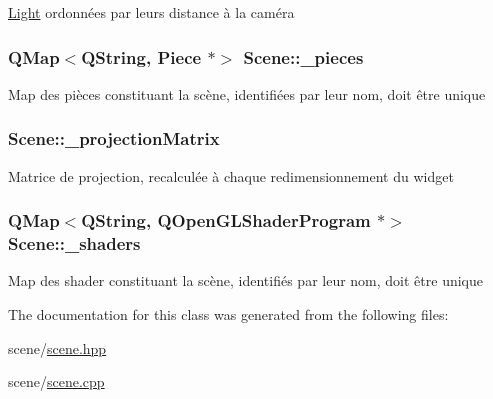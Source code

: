 \hyperlink{class_light}{Light} ordonnées par leurs distance à la caméra \hypertarget{class_scene_aa3a488d4be41fe6a187488e1e7a1035c}{
\subsubsection[{\+\_\+pieces}]{\setlength{\rightskip}{0pt plus 5cm}Q\+Map$<$Q\+String, {\bf Piece} $\ast$$>$ Scene\+::\+\_\+pieces\hspace{0.3cm}{\ttfamily [private]}}}\label{class_scene_aa3a488d4be41fe6a187488e1e7a1035c}
Map des pièces constituant la scène, identifiées par leur nom, doit être unique \hypertarget{class_scene_a7db3394191c0a07e6bdc456a53ac8ece}{
\subsubsection[{\+\_\+projection\+Matrix}]{ Scene\+::\+\_\+projection\+Matrix\hspace{0.3cm}{\ttfamily [private]}}}\label{class_scene_a7db3394191c0a07e6bdc456a53ac8ece}
Matrice de projection, recalculée à chaque redimensionnement du widget \hypertarget{class_scene_abde34dc03c8d3a07b3177041ab195f07}{
\subsubsection[{\+\_\+shaders}]{\setlength{\rightskip}{0pt plus 5cm}Q\+Map$<$Q\+String, Q\+Open\+G\+L\+Shader\+Program $\ast$$>$ Scene\+::\+\_\+shaders\hspace{0.3cm}{\ttfamily [private]}}}\label{class_scene_abde34dc03c8d3a07b3177041ab195f07}
Map des shader constituant la scène, identifiés par leur nom, doit être unique 

The documentation for this class was generated from the following files\+:\begin{DoxyCompactItemize}
\item 
scene/\hyperlink{scene_8hpp}{scene.\+hpp}\item 
scene/\hyperlink{scene_8cpp}{scene.\+cpp}\end{DoxyCompactItemize}

